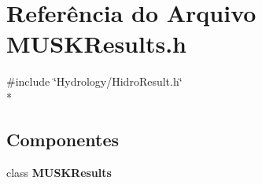 \section{Referência do Arquivo M\+U\+S\+K\+Results.\+h}
\label{_m_u_s_k_results_8h}
{\ttfamily \#include \char`\"{}Hydrology/\+Hidro\+Result.\+h\char`\"{}}\\*
\subsection*{Componentes}
\begin{DoxyCompactItemize}
\item 
class {\bf M\+U\+S\+K\+Results}
\end{DoxyCompactItemize}
